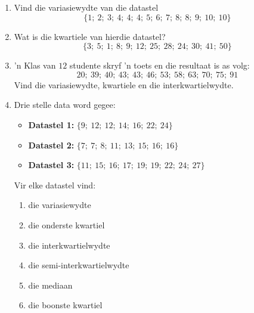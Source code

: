 \begin{exercises}{}{
  \begin{enumerate}[noitemsep, label=\textbf{\arabic*}.]

  \item Vind die variasiewydte van die datastel
    \begin{equation*}
      \{1;\ 2;\ 3;\ 4;\ 4;\ 4;\ 5;\ 6;\ 7;\ 8;\ 8;\ 9;\ 10;\ 10\}
    \end{equation*}

  \item Wat is die kwartiele van hierdie datastel?
    \begin{equation*}
      \{3;\ 5;\ 1;\ 8;\ 9;\ 12;\ 25;\ 28;\ 24;\ 30;\ 41;\ 50\}
    \end{equation*}

  \item ’n Klas van $12$ studente skryf ’n toets en die resultaat is as volg:
    \begin{equation*}
      20;\ 39;\ 40;\ 43;\ 43;\ 46;\ 53;\ 58;\ 63;\ 70;\ 75;\ 91
    \end{equation*}
    Vind die variasiewydte, kwartiele en die interkwartielwydte.

  \item Drie stelle data word gegee:
    \begin{itemize}  
    \item \textbf{Datastel 1:} $\{9;\ 12;\ 12;\ 14;\ 16;\ 22;\ 24\}$
    \item \textbf{Datastel 2:} $\{7;\ 7;\ 8;\ 11;\ 13;\ 15;\ 16;\ 16\}$
    \item \textbf{Datastel 3:} $\{11;\ 15;\ 16;\ 17;\ 19;\ 19;\ 22;\ 24;\ 27\}$
    \end{itemize}
    Vir elke datastel vind:
    \begin{enumerate}[noitemsep, label=\textbf{(\alph*)} ]
    \item die variasiewydte
    \item die onderste kwartiel
    \item die interkwartielwydte
    \item die semi-interkwartielwydte
    \item die mediaan
    \item die boonste kwartiel
    \end{enumerate}
  \end{enumerate}
}
\end{exercises}

